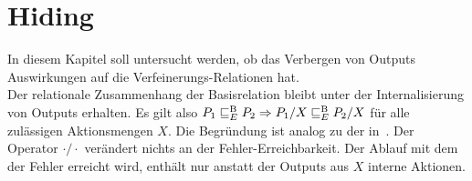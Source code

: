\section{Hiding}

In diesem Kapitel soll untersucht werden, ob das Verbergen von Outputs
Auswirkungen auf die Verfeinerungs-Relationen \ERel{} hat.\\
Der relationale Zusammenhang der Basisrelation \EBRel{} bleibt unter der
Internalisierung von Outputs erhalten. Es gilt also $P_1 \sqsubseteq  _E^\mathrm{B} P_2 \Rightarrow
P_1/X \sqsubseteq  _E^\mathrm{B} P_2/X$ für alle zulässigen Aktionsmengen $X$. Die Begründung ist
analog zu der in~\cite{Schinko2016BA}. Der Operator $\cdot /\cdot$ verändert
nichts an der Fehler-Erreichbarkeit. Der Ablauf mit dem der Fehler erreicht
wird, enthält nur anstatt der Outputs aus $X$ interne Aktionen.


